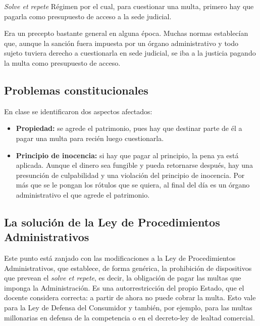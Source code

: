 \documentclass[12pt,oneside]{book}
\begin{document}
\begin{definition}{\textit{Solve et repete}}
Régimen por el cual, para cuestionar una multa, primero hay que pagarla como presupuesto de acceso a la sede judicial.
\end{definition}

Era un precepto bastante general en alguna época. Muchas normas establecían que, aunque la sanción fuera impuesta por un órgano administrativo y todo sujeto tuviera derecho a cuestionarla en sede judicial, se iba a la justicia pagando la multa como presupuesto de acceso.

\subsection{Problemas constitucionales}

En clase se identificaron dos aspectos afectados:
\begin{itemize}
    \item \textbf{Propiedad:} se agrede el patrimonio, pues hay que destinar parte de él a pagar una multa para recién luego cuestionarla.
    \item \textbf{Principio de inocencia:} si hay que pagar al principio, la pena ya está aplicada. Aunque el dinero sea fungible y pueda retornarse después, hay una presunción de culpabilidad y una violación del principio de inocencia. Por más que se le pongan los rótulos que se quiera, al final del día es un órgano administrativo el que agrede el patrimonio.
\end{itemize}

\subsection{La solución de la Ley de Procedimientos Administrativos}

Este punto está zanjado con las modificaciones a la Ley de Procedimientos Administrativos, que establece, de forma genérica, la prohibición de dispositivos que prevean el \textit{solve et repete}, es decir, la obligación de pagar las multas que imponga la Administración. Es una autorrestricción del propio Estado, que el docente considera correcta: a partir de ahora no puede cobrar la multa. Esto vale para la Ley de Defensa del Consumidor y también, por ejemplo, para las multas millonarias en defensa de la competencia o en el decreto-ley de lealtad comercial.

\end{document}
